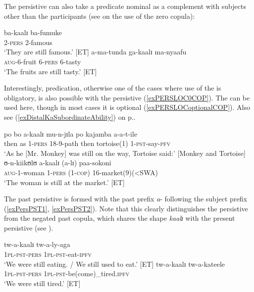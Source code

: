 The persistive can also take a predicate nominal as a complement with subjects other than the participants (see  on the use of the zero copula):
\begin{exe}
\ex \gll ba-kaalɪ ba-fumuke\\
2-\textsc{pers} 2-famous\\
\glt `They are still famous.' [ET]
\ex \gll a-ma-tunda ga-kaalɪ ma-nyaafu\\
\textsc{aug}-6-fruit 6-\textsc{pers} 6-tasty\\
\glt `The fruits are still tasty.' [ET]
\end{exe}

Interestingly,  predication, otherwise one of the cases where use of the  is obligatory, is also possible with the persistive (\ref{exPERSLOC0COP}). The  can be used here, though in most cases it is optional (\ref{exPERSLOCoptionalCOP}). Also see (\ref{exDistalKaSubordinateAbility}) on p.\nobreakspace\pageref{exDistalKaSubordinateAbility}.
\begin{exe}
\ex\label{exPERSLOC0COP} \gll po bo a-kaalɪ mu-n-jɪla po kajamba a-a-t-ile\\
then as 1-\textsc{pers} 18-9-path then tortoise(1) 1-\textsc{pst}-say-\textsc{pfv}\\
\glt `As he [Mr. Monkey] was still on the way, Tortoise said:' [Monkey and Tortoise]
\ex \label{exPERSLOCoptionalCOP} \gll ʊ-n-kiikʊlʊ a-kaalɪ (a-lɪ) paa-sokoni\\
\textsc{aug}-1-woman 1-\textsc{pers} (1-\textsc{cop}) 16-market(9)(<SWA)\\
\glt `The woman is still at the market.' [ET]
\end{exe}

The past persistive is formed with the past prefix \textit{a}- following the subject prefix (\ref{exPersPST1}, \ref{exPersPST2}). Note that this clearly distinguishes the persistive from the negated past copula, which shares the shape \textit{kaalɪ} with the present persistive (see ).

\begin{exe}
\ex \label{exPersPST1}\gll tw-a-kaalɪ tw-a-ly-aga\\
\textsc{1pl}-\textsc{pst}-\textsc{pers} \textsc{1pl}-\textsc{pst}-eat-\textsc{ipfv}\\
\glt \lq We were still eating. / We still used to eat.' [ET]
\ex \label{exPersPST2}\gll tw-a-kaalɪ tw-a-kateele\\
\textsc{1pl}-\textsc{pst}-\textsc{pers} \textsc{1pl}-\textsc{pst}-be(come)\_tired.\textsc{ipfv}\\
\glt \lq We were still tired.' [ET]
\end{exe}
